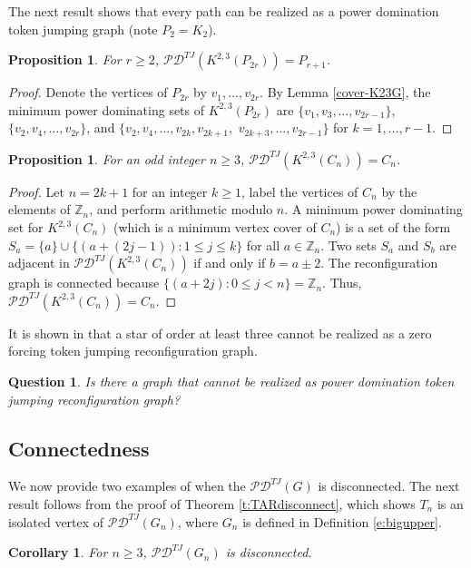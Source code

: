 \documentclass{article}
\numberwithin{figure}{section}   %
\newtheorem{cor}[thm]{Corollary}
\newtheorem{prop}[thm]{Proposition}
\newtheorem{quest}[thm]{Question}
\theoremstyle{definition}
\theoremstyle{definition}
\theoremstyle{definition}
\newcommand{\bpf}{\begin{proof}}
\newcommand{\epf}{\end{proof}\ms}
\newcommand{\ms}{\medskip}
\newcommand{\te}{\mathscr{PD}^{TJ}}
\begin{document}
The next result shows that every path can be realized as a power domination token jumping graph (note $P_2=K_2$).
\begin{prop} For  $r\ge 2$, $\te(K^{2,3}(P_{2r}))=P_{r+1}$.
 \end{prop}
\bpf
 Denote the vertices of $P_{2r}$ by $v_1,\dots,v_{2r}$.   By Lemma \ref{cover-K23G}, the minimum power dominating sets of $K^{2,3}(P_{2r})$ are $\{v_1, v_3,\dots,v_{2r-1}\}$, $\{v_2, v_4,\dots,v_{2r}\}$, and $\{v_2, v_4,\dots,v_{2k},v_{2k+1},$ $v_{2k+3},\dots,v_{2r-1}\}$ for $k=1,\dots,r-1$.
\epf


\begin{prop}\label{TJoddcycle} For an odd integer $n \geq 3$, 
$\te(K^{2,3}(C_n))=C_n$.
\end{prop}

\bpf 
Let $n=2k+1$ for an integer $k \geq 1$, label the vertices of $C_n$ by the elements of $\mathbb{Z}_n$, and perform arithmetic modulo $n$. A minimum power dominating set for $K^{2,3}(C_n)$ (which is a minimum vertex cover of $C_n$) is a set of the form $S_a = \{ a \} \cup \{(a+(2j-1)):1 \leq j \leq k \}$ for all $a \in \mathbb{Z}_n$. Two sets $S_a$ and $S_b$ are adjacent in $\te(K^{2,3}(C_n))$ if and only if $b=a \pm 2$. The reconfiguration graph is connected because $\{ (a+2j): 0 \leq j <n \}=\mathbb{Z}_n$. Thus, $\te(K^{2,3}(C_n))=C_n$.
\epf

It is shown in \cite{GHH} that a star of order at least three cannot be realized as a zero forcing token jumping reconfiguration graph. 

\begin{quest} Is there a graph that cannot be realized as power domination token jumping reconfiguration graph?
\end{quest}




\subsection{Connectedness}%
We now provide two examples of when the $\te(G)$ is disconnected. The next result follows from the proof of Theorem \ref{t:TARdisconnect}, which shows $T_n$ is an isolated vertex of $\te(G_n)$, where $G_n$ is defined in Definition \ref{e:bigupper}.

\begin{cor}
For $n\ge 3$,  $\te(G_n)$ is disconnected.
\end{cor}
\end{document}

